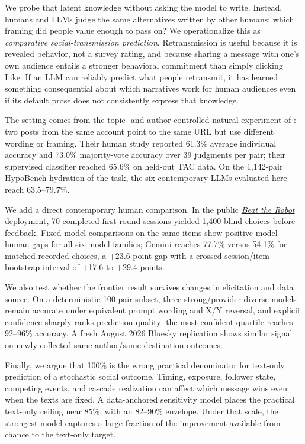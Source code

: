 \documentclass[10pt,twocolumn]{article}
\begin{document}
We probe that latent knowledge without asking the model to write. Instead, humans and LLMs judge the same alternatives written by other humans: which framing did people value enough to pass on? We operationalize this as \emph{comparative social-transmission prediction}. Retransmission is useful because it is revealed behavior, not a survey rating, and because sharing a message with one's own audience entails a stronger behavioral commitment than simply clicking Like. If an LLM can reliably predict what people retransmit, it has learned something consequential about which narratives work for human audiences even if its default prose does not consistently express that knowledge.

The setting comes from the topic- and author-controlled natural experiment of \citet{tan2014}: two posts from the same account point to the same URL but use different wording or framing. Their human study reported 61.3\% average individual accuracy and 73.0\% majority-vote accuracy over 39 judgments per pair; their supervised classifier reached 65.6\% on held-out TAC data. On the 1,142-pair HypoBench hydration of the task, the six contemporary LLMs evaluated here reach 63.5--79.7\%.

We add a direct contemporary human comparison. In the public \href{https://beat-the-robot.peacetech.vc/}{\emph{Beat the Robot}} deployment, 70 completed first-round sessions yielded 1,400 blind choices before feedback. Fixed-model comparisons on the same items show positive model--human gaps for all six model families; Gemini reaches 77.7\% versus 54.1\% for matched recorded choices, a +23.6-point gap with a crossed session/item bootstrap interval of +17.6 to +29.4 points.

We also test whether the frontier result survives changes in elicitation and data source. On a deterministic 100-pair subset, three strong/provider-diverse models remain accurate under equivalent prompt wording and X/Y reversal, and explicit confidence sharply ranks prediction quality: the most-confident quartile reaches 92--96\% accuracy. A fresh August 2026 Bluesky replication shows similar signal on newly collected same-author/same-destination outcomes.

Finally, we argue that 100\% is the wrong practical denominator for text-only prediction of a stochastic social outcome. Timing, exposure, follower state, competing events, and cascade realization can affect which message wins even when the texts are fixed. A data-anchored sensitivity model places the practical text-only ceiling near 85\%, with an 82--90\% envelope. Under that scale, the strongest model captures a large fraction of the improvement available from chance to the text-only target.
\end{document}
